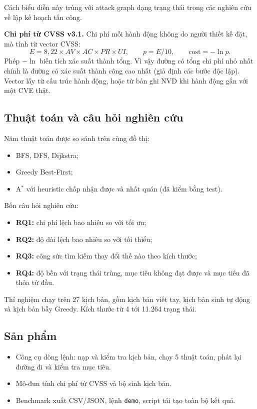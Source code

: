 \documentclass[11pt,a4paper]{article}
\begin{document}
Cách biểu diễn này trùng với attack graph dạng trạng thái trong các nghiên cứu về lập kế hoạch tấn công.

\textbf{Chi phí từ CVSS v3.1.} Chi phí mỗi hành động không do người thiết kế đặt, mà tính từ vector CVSS:
\[
E = 8{,}22 \times AV \times AC \times PR \times UI,\qquad p = E/10,\qquad \text{cost} = -\ln p .
\]
Phép $-\ln$ biến tích xác suất thành tổng. Vì vậy đường có tổng chi phí nhỏ nhất chính là đường có xác suất thành công cao nhất (giả định các bước độc lập). Vector lấy từ cấu trúc hành động, hoặc từ bản ghi NVD khi hành động gắn với một CVE thật.

\subsection{Thuật toán và câu hỏi nghiên cứu}

Năm thuật toán được so sánh trên cùng đồ thị:
\begin{itemize}
  \item BFS, DFS, Dijkstra;
  \item Greedy Best-First;
  \item A$^{*}$ với heuristic chấp nhận được và nhất quán (đã kiểm bằng test).
\end{itemize}

Bốn câu hỏi nghiên cứu:
\begin{itemize}
  \item \textbf{RQ1:} chi phí lệch bao nhiêu so với tối ưu;
  \item \textbf{RQ2:} độ dài lệch bao nhiêu so với tối thiểu;
  \item \textbf{RQ3:} công sức tìm kiếm thay đổi thế nào theo kích thước;
  \item \textbf{RQ4:} độ bền với trạng thái trùng, mục tiêu không đạt được và mục tiêu đã thỏa từ đầu.
\end{itemize}

Thí nghiệm chạy trên 27 kịch bản, gồm kịch bản viết tay, kịch bản sinh tự động và kịch bản bẫy Greedy. Kích thước từ 4 tới 11.264 trạng thái.

\subsection{Sản phẩm}

\begin{itemize}
  \item Công cụ dòng lệnh: nạp và kiểm tra kịch bản, chạy 5 thuật toán, phát lại đường đi và kiểm tra mục tiêu.
  \item Mô-đun tính chi phí từ CVSS và bộ sinh kịch bản.
  \item Benchmark xuất CSV/JSON, lệnh \texttt{demo}, script tái tạo toàn bộ kết quả.
\end{itemize}
\end{document}
